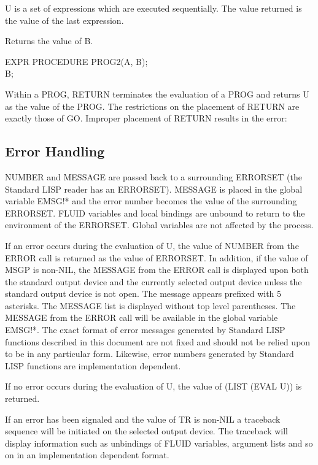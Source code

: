 {U is a set of expressions which are executed sequentially. The value
returned is the value of the last expression.}


{Returns the value of B.

{\tt \begin{tabbing} EXPR PROCEDURE PROG2(A, B);\\
\hspace*{1em} B;
\end{tabbing}}}


{Within a PROG, RETURN terminates the evaluation of a PROG and returns
U as the value of the PROG. The restrictions on the placement of
RETURN are exactly those of GO. Improper placement of RETURN results
in the error:

}


\subsection{Error Handling}
\label{errors}

{NUMBER and MESSAGE are passed back to a surrounding ERRORSET (the
Standard LISP reader has an ERRORSET). MESSAGE is placed in the
global variable EMSG!* and the error number becomes the value of the
surrounding ERRORSET. FLUID variables and local bindings are unbound
to return to the environment of the ERRORSET. Global variables are not
affected by the process.}


{If an error occurs during the evaluation of U, the value of NUMBER
from the ERROR call is returned as the value of ERRORSET. In addition,
if the value of MSGP is non-NIL, the MESSAGE from the ERROR call is
displayed upon both the standard output device and the currently
selected output device unless the standard output device is not open.
The message appears prefixed with 5 asterisks. The MESSAGE
list is displayed without top level parentheses. The MESSAGE from the
ERROR call will be available in the global variable EMSG!*. The exact
format of error messages generated by Standard LISP functions
described in this document are not fixed and should not be relied upon
to be in any particular form. Likewise, error numbers generated by
Standard LISP functions are implementation dependent.

If no error occurs during the evaluation of U, the value of (LIST
(EVAL U)) is returned.

If an error has been signaled and the value of TR is non-NIL a
traceback sequence will be initiated on the selected output device.
The traceback will display information such as unbindings of FLUID
variables, argument lists and so on in an implementation dependent
format.}


